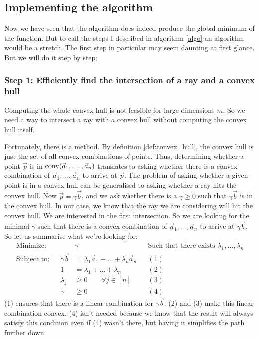 \subsection{Implementing the algorithm}
Now we have seen that the algorithm does indeed produce the global minimum of the function. But to call the steps I described in algorithm \ref{algo} an algorithm would be a stretch. The first step in particular may seem daunting at first glance. But we will do it step by step:

\subsubsection{Step 1: Efficiently find the intersection of a ray and a convex hull}
Computing the whole convex hull is not feasible for large dimensions $m$. So we need a way to intersect a ray with a convex hull without computing the convex hull itself.

Fortunately, there is a method. By definition \ref{def:convex_hull}, the convex hull is just the set of all convex combinations of points. Thus, determining whether a point $\vec p$ is in $\operatorname{conv}(\vec a_1, \dots, \vec a_n)$ translates to asking whether there is a convex combination of $\vec a_1, \dots, \vec a_n$ to arrive at $\vec p$. The problem of asking whether a given point is in a convex hull can be generalised to asking whether a ray hits the convex hull. Now $\vec p = \gamma \vec b$, and we ask whether there is a $\gamma \geq 0$ such that $\gamma\vec b$ is in the convex hull. In our case, we know that the ray we are considering will hit the convex hull. We are interested in the first intersection. So we are looking for the minimal $\gamma$ such that there is a convex combination of $\vec a_1, \dots, \vec a_n$ to arrive at $\gamma\vec b$. So let us summarise what we're looking for:
\begin{align*}
    \text{Minimize:}&&&\gamma  &&\text{Such that there exists } \lambda_1, \dots, \lambda_n\\
    \text{Subject to:}&&\gamma \vec b &=\lambda_1\vec a_1 + \dots  + \lambda_n\vec a_n &&(1)\\
    && 1 &= \lambda_1 + \dots + \lambda_n &&(2)\\
    && \lambda_j &\geq 0\qquad \forall j\in[n] &&(3)\\
    && \gamma &\geq 0 &&(4)
\end{align*}
(1) ensures that there is a linear combination for $\gamma\vec b$. (2) and (3) make this linear combination convex. (4) isn't needed because we know that the result will always satisfy this condition even if (4) wasn't there, but having it simplifies the path further down.

